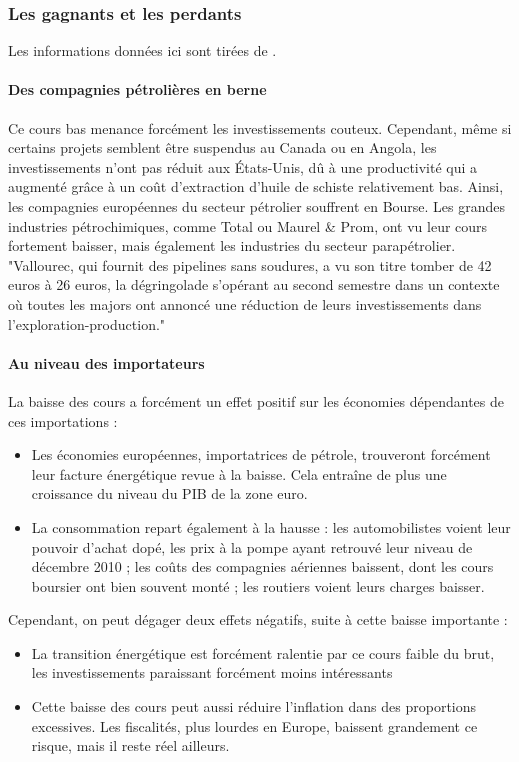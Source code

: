 \subsubsection{Les gagnants et les perdants}
Les informations données ici sont tirées de \cite{mndGagnPerd}.

\paragraph{Des compagnies pétrolières en berne}
Ce cours bas menance forcément les investissements couteux. Cependant, même si certains projets semblent être suspendus au Canada ou en Angola, les investissements n’ont pas réduit aux États-Unis, dû à une productivité qui a augmenté grâce à un coût d’extraction d’huile de schiste relativement bas. Ainsi, les compagnies européennes du secteur pétrolier souffrent en Bourse. Les grandes industries pétrochimiques, comme Total ou Maurel \& Prom, ont vu leur cours fortement baisser, mais également les industries du secteur parapétrolier. "Vallourec, qui fournit des pipelines sans soudures, a vu son titre tomber de 42 euros à 26 euros, la dégringolade s’opérant au second semestre dans un contexte où toutes les majors ont annoncé une réduction de leurs investissements dans l’exploration-production."

\paragraph{Au niveau des importateurs}
La baisse des cours a forcément un effet positif sur les économies dépendantes de ces importations :
\begin{itemize}
\item Les économies européennes, importatrices de pétrole, trouveront forcément leur facture énergétique revue à la baisse. Cela entraîne de plus une croissance du niveau du PIB de la zone euro.
\item La consommation repart également à la hausse : les automobilistes voient leur pouvoir d’achat dopé, les prix à la pompe ayant retrouvé leur niveau de décembre 2010 ; les coûts des compagnies aériennes baissent, dont les cours boursier ont bien souvent monté ; les routiers voient leurs charges baisser.
\end{itemize}
Cependant, on peut dégager deux effets négatifs, suite à cette baisse importante :
\begin{itemize}
\item La transition énergétique est forcément ralentie par ce cours faible du brut, les investissements paraissant forcément moins intéressants 
\item Cette baisse des cours peut aussi réduire l’inflation dans des proportions excessives. Les fiscalités, plus lourdes en Europe, baissent grandement ce risque, mais il reste réel ailleurs.
\end{itemize}

